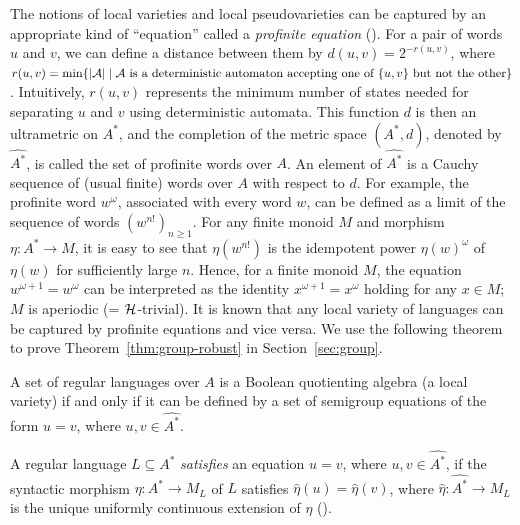 The notions of local varieties and local pseudovarieties can be captured by an appropriate kind of ``equation'' called a \emph{profinite equation} (\cf \cite{profinite}).
For a pair of words \(u\) and \(v\), we can define a distance between them by
\(d(u, v) = 2^{-r(u,v)}\),
where \(r(u,v) = \min\{ \lvert{\cal A}\rvert \mid {\cal A} \text{ is a deterministic automaton accepting one of } \{u, v\} \text{ but not the other} \}\).
Intuitively, \(r(u,v)\) represents the minimum number of states needed for separating \(u\) and \(v\) using deterministic automata.
This function \(d\) is then an ultrametric on \(A^*\), and the completion of the metric space \((A^*, d)\), denoted by \(\widehat{A^*}\), is called the set of profinite words over \(A\).
An element of \(\widehat{A^*}\) is a Cauchy sequence of (usual finite) words over \(A\) with respect to \(d\).
For example, the profinite word \(w^\omega\), associated with every word \(w\), can be defined as a limit of the sequence of words \((w^{n!})_{n \geq 1}\).
For any finite monoid \(M\) and morphism \(\eta \colon A^* \rightarrow M\), it is easy to see that \(\eta(w^{n!})\) is the idempotent power \(\eta(w)^{\omega}\) of \(\eta(w)\) for sufficiently large \(n\).
Hence, for a finite monoid \(M\), the equation \(w^{\omega+1} = w^{\omega}\) can be interpreted as the identity \(x^{\omega+1} = x^\omega\) holding for any \(x \in M\); \ie 
\(M\) is aperiodic (= \(\mathrel{\cal H}\)-trivial).
It is known that any local variety of languages can be captured by profinite equations and vice versa.
We use the following theorem to prove Theorem~\ref{thm:group-robust} in Section~\ref{sec:group}.
\begin{theorem}\label{thm:duality}
  A set of regular languages over \(A\) is a Boolean quotienting algebra (\ie a local variety)
  if and only if it can be defined by a set of semigroup equations of the form \(u = v\), where \(u, v \in \widehat{A^*}\).
\end{theorem}
A regular language \(L \subseteq A^*\) \emph{satisfies} an equation \(u = v\), where \(u, v \in \widehat{A^*}\),
if the syntactic morphism \(\eta\colon A^* \to M_L\) of \(L\) satisfies \(\hat{\eta}(u) = \hat{\eta}(v)\),
where \(\hat{\eta}\colon \widehat{A^*} \to M_L\) is the unique uniformly continuous extension of \(\eta\)
(\cf \cite[Chapter X, Proposition 2.10]{MPRI}).

